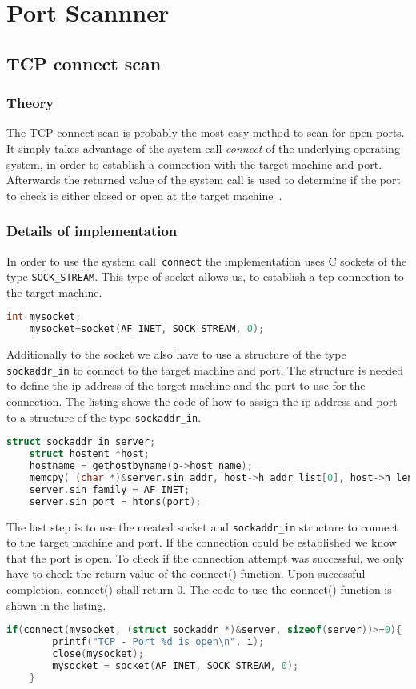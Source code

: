 \chapter{Port Scannner}
\section{TCP connect scan}

\label{sec:connect}
	\subsection{Theory}
	The TCP connect scan is probably the most easy method to scan for open ports. It simply takes advantage of the system call
	\emph{connect} of the underlying operating system, in order to establish a connection with the target machine and port. Afterwards the
	returned value of the system call is used to determine if the port to check is either closed or open at the target machine~\cite{nmap2009}.
	
	
	\subsection{Details of implementation}
	In order to use the system call~\lstinline{connect} the implementation uses C sockets of the type \lstinline|SOCK_STREAM|. This type
	of socket allows us, to establish a tcp connection to the target machine.
	\begin{lstlisting}[frame= single, language=C, caption=C code to create a tcp socket in C]
	int mysocket;
	mysocket=socket(AF_INET, SOCK_STREAM, 0);
	\end{lstlisting}
	Additionally to the socket we also have to use a structure of the type \lstinline|sockaddr_in| to connect to the target machine and port.
	The structure is needed to define the ip address of the target machine and the port to use for the connection. The listing shows the
	code of how to assign the ip address and port to a structure of the type \lstinline|sockaddr_in|. 
	\begin{lstlisting}[frame= single, language=C, caption= C code to use the structure \lstinline|sockaddr_in|]
	struct sockaddr_in server;
	struct hostent *host;
	hostname = gethostbyname(p->host_name);
	memcpy( (char *)&server.sin_addr, host->h_addr_list[0], host->h_length);
	server.sin_family = AF_INET;
	server.sin_port = htons(port);
	\end{lstlisting}
	The last step is to use the created socket and  \lstinline|sockaddr_in| structure to connect to the target machine and port. If the 
	connection could be established we know that the port is open. To check if the connection attempt was successful, we only have to
	check the return value of the connect() function. Upon successful completion, connect() shall return 0. The code to use the connect() function is shown in the listing.
	\begin{lstlisting}[frame= single, language=C, caption= C code to use the connect() to check if port is open]
	if(connect(mysocket, (struct sockaddr *)&server, sizeof(server))>=0){
		printf("TCP - Port %d is open\n", i);
		close(mysocket);
		mysocket = socket(AF_INET, SOCK_STREAM, 0);
	}
	\end{lstlisting}
	
